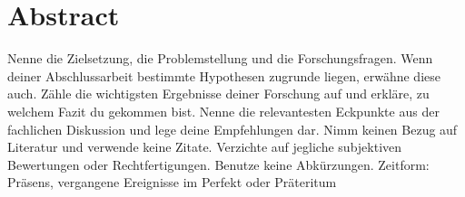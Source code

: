 \section*{Abstract} %
Nenne die Zielsetzung, die Problemstellung und die Forschungsfragen. Wenn deiner Abschlussarbeit bestimmte Hypothesen zugrunde liegen, erwähne diese auch.
Zähle die wichtigsten Ergebnisse deiner Forschung auf und erkläre, zu welchem Fazit du gekommen bist.
Nenne die relevantesten Eckpunkte aus der fachlichen Diskussion und lege deine Empfehlungen dar.
Nimm keinen Bezug auf Literatur und verwende keine Zitate.
Verzichte auf jegliche subjektiven Bewertungen oder Rechtfertigungen.
Benutze keine Abkürzungen.
Zeitform: Präsens, vergangene Ereignisse im Perfekt oder Präteritum